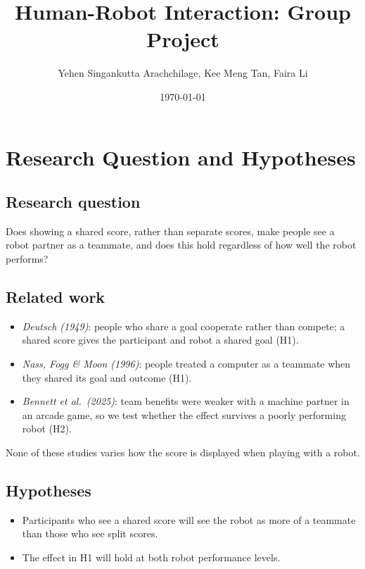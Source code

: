 \documentclass[12pt]{article}
\title{Human-Robot Interaction: Group Project}
\author{Yehen Singankutta Arachchilage, Kee Meng Tan, Faira Li}
\date{\today}
\begin{document}
\setlength{\droptitle}{-2.5cm}

\maketitle


\section{Research Question and Hypotheses}

\subsection{Research question}
Does showing a shared score, rather than separate scores, make people see a robot partner as a teammate, and does this hold regardless of how well the robot performs?

\subsection{Related work}
\begin{itemize}[nosep]
    \item \textit{Deutsch (1949)}: people who share a goal cooperate rather than compete; a shared score gives the participant and robot a shared goal (H1).
    \item \textit{Nass, Fogg \& Moon (1996)}: people treated a computer as a teammate when they shared its goal and outcome (H1).
    \item \textit{Bennett et al.\ (2025)}: team benefits were weaker with a machine partner in an arcade game, so we test whether the effect survives a poorly performing robot (H2).
\end{itemize}
None of these studies varies how the score is displayed when playing with a robot.

\subsection{Hypotheses}
\begin{itemize}
    \item[\textbf{H1:}] Participants who see a shared score will see the robot as more of a teammate than those who see split scores.
    
    \item[\textbf{H2:}] The effect in H1 will hold at both robot performance levels.     
\end{itemize}





\clearpage
\appendix

\end{document}
